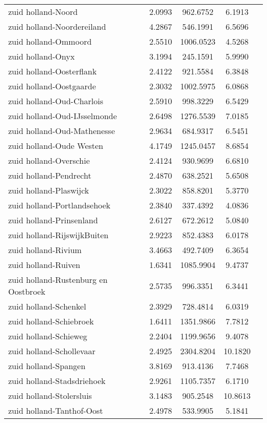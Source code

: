 \begin{longtable}{llccc}
zuid holland-Noord & 2.0993 & 962.6752 & 6.1913 \\
zuid holland-Noordereiland & 4.2867 & 546.1991 & 6.5696 \\
zuid holland-Ommoord & 2.5510 & 1006.0523 & 4.5268 \\
zuid holland-Onyx & 3.1994 & 245.1591 & 5.9990 \\
zuid holland-Oosterflank & 2.4122 & 921.5584 & 6.3848 \\
zuid holland-Oostgaarde & 2.3032 & 1002.5975 & 6.0868 \\
zuid holland-Oud-Charlois & 2.5910 & 998.3229 & 6.5429 \\
zuid holland-Oud-IJsselmonde & 2.6498 & 1276.5539 & 7.0185 \\
zuid holland-Oud-Mathenesse & 2.9634 & 684.9317 & 6.5451 \\
zuid holland-Oude Westen & 4.1749 & 1245.0457 & 8.6854 \\
zuid holland-Overschie & 2.4124 & 930.9699 & 6.6810 \\
zuid holland-Pendrecht & 2.4870 & 638.2521 & 5.6508 \\
zuid holland-Plaswijck & 2.3022 & 858.8201 & 5.3770 \\
zuid holland-Portlandsehoek & 2.3840 & 337.4392 & 4.0836 \\
zuid holland-Prinsenland & 2.6127 & 672.2612 & 5.0840 \\
zuid holland-RijswijkBuiten & 2.9223 & 852.4383 & 6.0178 \\
zuid holland-Rivium & 3.4663 & 492.7409 & 6.3654 \\
zuid holland-Ruiven & 1.6341 & 1085.9904 & 9.4737 \\
zuid holland-Rustenburg en Oostbroek & 2.5735 & 996.3351 & 6.3441 \\
zuid holland-Schenkel & 2.3929 & 728.4814 & 6.0319 \\
zuid holland-Schiebroek & 1.6411 & 1351.9866 & 7.7812 \\
zuid holland-Schieweg & 2.2404 & 1199.9656 & 9.4078 \\
zuid holland-Schollevaar & 2.4925 & 2304.8204 & 10.1820 \\
zuid holland-Spangen & 3.8169 & 913.4136 & 7.7468 \\
zuid holland-Stadsdriehoek & 2.9261 & 1105.7357 & 6.1710 \\
zuid holland-Stolersluis & 3.1483 & 905.2548 & 10.8613 \\
zuid holland-Tanthof-Oost & 2.4978 & 533.9905 & 5.1841 \\

\end{longtable}
